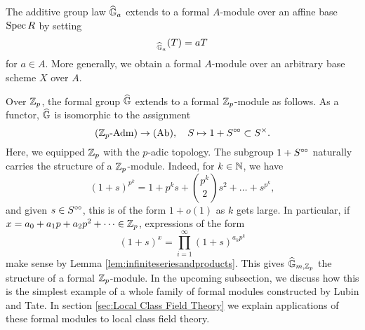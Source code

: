 \documentclass[../main.tex]{subfiles}
\begin{document}
\begin{xpl}
  The additive group law $\widehat{\mathbb{G}}_a$ extends to a formal $A$-module over an affine base
  $\operatorname{Spec} R$ by setting 
  \begin{equation*}
    [a]_{\Ghat_a}(T) = aT
  \end{equation*}
  for $a \in A$. More generally, we obtain a formal $A$-module over an
  arbitrary base scheme $X$ over $A$.

  Over $\mathbb{Z}_p$, the formal group $\widehat{\mathbb{G}}$ extends to a formal 
  $\mathbb{Z}_p$-module as follows. 
  As a functor, $\widehat{\mathbb{G}}$ is isomorphic to the assignment
  \begin{equation*}
    {({\mathbb{Z}_p}\text-\allowbreak\mathrm{Adm})} \to {(\mathrm{Ab})}, \quad S \mapsto 1 + S^{\circ \hspace{-0.5pt} \circ} \subset S^\times.
  \end{equation*}
  Here, we equipped $\mathbb{Z}_p$ with the $p$-adic topology.
  The subgroup $1 + S^{\circ \hspace{-0.5pt} \circ}$ naturally carries the structure of a $\mathbb{Z}_p$-module.
  Indeed, for $k \in \mathbb{N}$, we have
  \begin{equation*}
    (1+s)^{p^k} = 1 + p^ks + \binom{p^k}2 s^2 + \dots + s^{p^k},
  \end{equation*}
  and given $s \in S^{\circ \hspace{-0.5pt} \circ}$, this is of the form $1+ o(1)$ as $k$ gets large. 
  In particular, if $x = a_0 + a_1 p + a_2p^2 + \dots \in \mathbb{Z}_p$, expressions of
  the form
  \begin{equation*}
    (1+s)^x = \prod_{i = 1}^\infty (1+s)^{a_k p^k}
  \end{equation*}
  make sense by Lemma \ref{lem:infiniteseriesandproducts}. This gives
  $\widehat{\mathbb{G}}_{m,\mathbb{Z}_p}$ the structure of a formal $\mathbb{Z}_p$-module. 
  In the upcoming subsection, we discuss how this is the simplest example of a
  whole family of formal modules constructed by 
  Lubin and Tate. In section \ref{sec:Local Class Field Theory} we explain applications of these formal modules to local class field theory.
\end{xpl}
\end{document}
